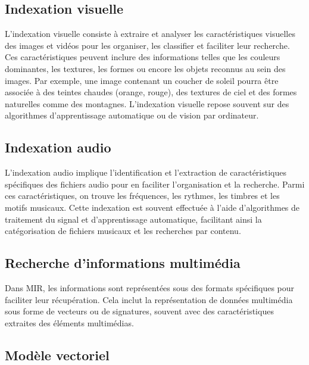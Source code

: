 \begin{section}
 \subsection{Indexation visuelle}

 L’indexation visuelle consiste à extraire et analyser les caractéristiques
 visuelles des images et vidéos pour les organiser, les classifier et faciliter
 leur recherche. Ces caractéristiques peuvent inclure des informations telles
 que les couleurs dominantes, les textures, les formes ou encore les objets
 reconnus au sein des images. Par exemple, une image contenant un coucher de
 soleil pourra être associée à des teintes chaudes (orange, rouge), des textures
 de ciel et des formes naturelles comme des montagnes. L’indexation visuelle
 repose souvent sur des algorithmes d’apprentissage automatique ou de vision par
 ordinateur.

 \subsection{Indexation audio}

 L’indexation audio implique l’identification et l’extraction de
 caractéristiques spécifiques des fichiers audio pour en faciliter
 l’organisation et la recherche. Parmi ces caractéristiques, on trouve les
 fréquences, les rythmes, les timbres et les motifs musicaux. Cette indexation
 est souvent effectuée à l’aide d’algorithmes de traitement du signal et
 d’apprentissage automatique, facilitant ainsi la catégorisation de fichiers
 musicaux et les recherches par contenu.

 \section{Recherche d'informations multimédia}

 Dans MIR, les informations sont représentées sous des formats spécifiques pour
 faciliter leur récupération. Cela inclut la représentation de données
 multimédia sous forme de vecteurs ou de signatures, souvent avec des
 caractéristiques extraites des éléments multimédias.

 \subsection{Modèle vectoriel}


\end{section}

